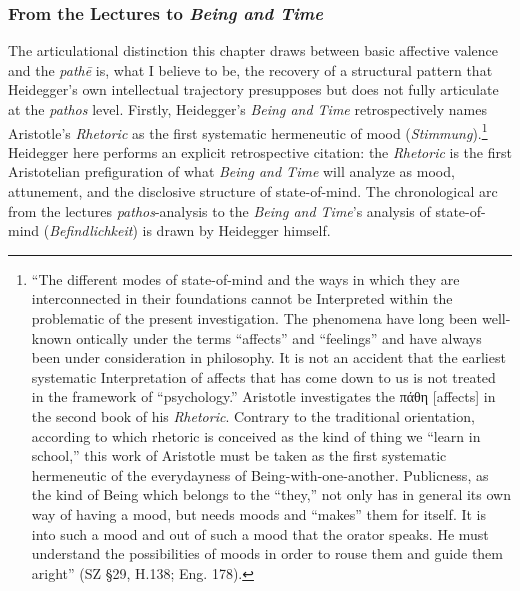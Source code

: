 \documentclass{article}
\newcommand{\gk}[1]{{\greekfont #1}}
\begin{document}
\subsubsection{From the Lectures to \textit{Being and Time}}

The articulational distinction this chapter draws between basic affective valence and the \textit{pathē} is, what I believe to be, the recovery of a structural pattern that Heidegger's own intellectual trajectory presupposes but does not fully articulate at the \textit{pathos} level. Firstly, Heidegger's \textit{Being and Time} retrospectively names Aristotle's \textit{Rhetoric} as the first systematic hermeneutic of mood (\textit{Stimmung}).\footnote{``The different modes of state-of-mind and the ways in which they are interconnected in their foundations cannot be Interpreted within the problematic of the present investigation. The phenomena have long been well-known ontically under the terms ``affects'' and ``feelings'' and have always been under consideration in philosophy. It is not an accident that the earliest systematic Interpretation of affects that has come down to us is not treated in the framework of ``psychology.'' Aristotle investigates the \gk{πάθη} [affects] in the second book of his \textit{Rhetoric}. Contrary to the traditional orientation, according to which rhetoric is conceived as the kind of thing we ``learn in school,'' this work of Aristotle must be taken as the first systematic hermeneutic of the everydayness of Being-with-one-another. Publicness, as the kind of Being which belongs to the ``they,'' not only has in general its own way of having a mood, but needs moods and ``makes'' them for itself. It is into such a mood and out of such a mood that the orator speaks. He must understand the possibilities of moods in order to rouse them and guide them aright'' (SZ \S29, H.138; Eng. 178).} Heidegger here performs an explicit retrospective citation: the \textit{Rhetoric} is the first Aristotelian prefiguration of what \textit{Being and Time} will analyze as mood, attunement, and the disclosive structure of state-of-mind. The chronological arc from the lectures \textit{pathos}-analysis to the \textit{Being and Time}'s analysis of state-of-mind (\textit{Befindlichkeit}) is drawn by Heidegger himself. 
\end{document}
